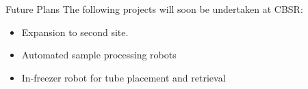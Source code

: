 \documentclass[hyperref={pdfpagelabels=false}]{beamer}
\begin{document}
\begin{frame}{Future Plans}{}
  The following projects will soon be undertaken at CBSR:
  \begin{itemize}
  \item Expansion to second site.
  \item Automated sample processing robots
  \item In-freezer robot for tube placement and retrieval
  \end{itemize}
\end{frame}

\end{document}
